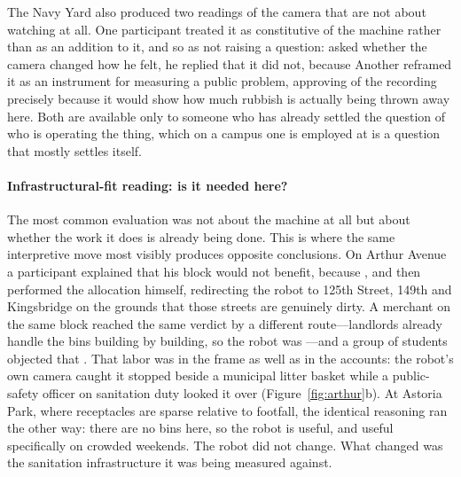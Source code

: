 The Navy Yard also produced two readings of the camera that are not about
watching at all. One participant treated it as constitutive of the machine rather
than as an addition to it, and so as not raising a question: asked whether the
camera changed how he felt, he replied that it did not, because
 Another reframed it as an instrument for measuring a public problem,
approving of the recording precisely because it would show how much rubbish is
actually being thrown away here. Both are available only to
someone who has already settled the question of who is operating the thing, which
on a campus one is employed at is a question that mostly settles itself.

\paragraph{Infrastructural-fit reading: is it needed here?}
The most common evaluation was not about the machine at all but about whether the
work it does is already being done. This is where the same interpretive move most
visibly produces opposite conclusions. On Arthur Avenue a participant explained
that his block would not benefit, because , and then performed the
allocation himself, redirecting the robot to 125th Street, 149th and Kingsbridge
on the grounds that those streets are genuinely dirty. A merchant on the same
block reached the same verdict by a different route---landlords already handle
the bins building by building, so the robot was ---and a group of
students objected that . That
labor was in the frame as well as in the accounts: the robot's own camera
caught it stopped beside a municipal litter basket while a public-safety
officer on sanitation duty looked it over (Figure~\ref{fig:arthur}b). At
Astoria Park, where receptacles are sparse relative to footfall, the identical
reasoning ran the other way: there are no bins here, so the robot is useful, and
useful specifically on crowded weekends. The robot did not change. What changed
was the sanitation infrastructure it was being measured against.

